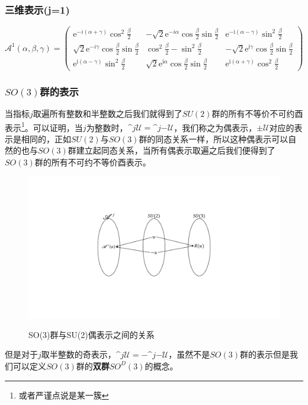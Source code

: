 \subsubsection*{三维表示(j=1)}
\begin{equation}
	\mathcal{A}^{1}(\alpha,\beta,\gamma)=\left(\begin{array}{ccc}
		\mathrm{e}^{-i(\alpha+\gamma)} \cos ^{2} \frac{\beta}{2} & -\sqrt{2} \mathrm{e}^{-i \alpha} \cos \frac{\beta}{2} \sin \frac{\beta}{2} & \mathrm{e}^{-\mathrm{i}(\alpha-\gamma)} \sin ^{2} \frac{\beta}{2} \\
		\sqrt{2} \mathrm{e}^{-i \gamma} \cos \frac{\beta}{2} \sin \frac{\beta}{2} & \cos ^{2} \frac{\beta}{2}-\sin ^{2} \frac{\beta}{2} & -\sqrt{2} \mathrm{e}^{\mathrm{i} \gamma} \cos \frac{\beta}{2} \sin \frac{\beta}{2} \\
		\mathrm{e}^{\mathrm{i}(\alpha-\gamma)} \sin ^{2} \frac{\beta}{2} & \sqrt{2} \mathrm{e}^{\mathrm{i} \alpha} \cos \frac{\beta}{2} \sin \frac{\beta}{2} & \mathrm{e}^{\mathrm{i}(\alpha+\gamma)} \cos ^{2} \frac{\beta}{2}
	\end{array}\right)
\end{equation}
\subsubsection*{$SO(3)$群的表示}
当指标$j$取遍所有整数和半整数之后我们就得到了$SU(2)$群的所有不等价不可约酉表示\footnote{或者严谨点说是某一簇}。可以证明，当$j$为整数时，$\mathscr^j{\mathcal{U}}=\mathscr^j{-\mathcal{U}}$，我们称之为偶表示，$\pm\mathcal{U}$对应的表示是相同的，正如$SU(2)$与$SO(3)$群的同态关系一样，所以这种偶表示可以自然的也与$SO(3)$群建立起同态关系，当所有偶表示取遍之后我们便得到了$SO(3)$群的所有不可约不等价酉表示。

\begin{figure}[h]
	\centering
	\includegraphics[width=0.6\linewidth]{fig/D.4.pdf}
	\label{fig:D.4}
	\caption{SO(3)群与SU(2)偶表示之间的关系}
\end{figure}

但是对于$j$取半整数的奇表示，$\mathscr^j{\mathcal{U}}=-\mathscr^j{-\mathcal{U}}$，虽然不是$SO(3)$群的表示但是我们可以定义$SO(3)$群的\textbf{双群$SO^D(3)$}的概念。

